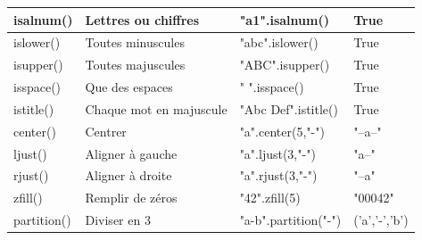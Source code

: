 \documentclass[12pt,a4paper]{article}
\begin{document}
\begin{longtable}{|>{\ttfamily}m{2.5cm}|m{3cm}|>{\ttfamily}m{4cm}|m{2.5cm}|}
		isalnum() & Lettres ou chiffres & "a1".isalnum() & True \\
		\hline
		islower() & Toutes minuscules & "abc".islower() & True \\
		\hline
		\rowcolor{grisclair}
		isupper() & Toutes majuscules & "ABC".isupper() & True \\
		\hline
		isspace() & Que des espaces & " ".isspace() & True \\
		\hline
		\rowcolor{grisclair}
		istitle() & Chaque mot en majuscule & "Abc Def".istitle() & True \\
		\hline
		center() & Centrer & "a".center(5,"-") & "--a--" \\
		\hline
		\rowcolor{grisclair}
		ljust() & Aligner à gauche & "a".ljust(3,"-") & "a--" \\
		\hline
		rjust() & Aligner à droite & "a".rjust(3,"-") & "--a" \\
		\hline
		\rowcolor{grisclair}
		zfill() & Remplir de zéros & "42".zfill(5) & "00042" \\
		\hline
		partition() & Diviser en 3 & "a-b".partition("-") & ('a','-','b') \\
		\hline
	\end{longtable}
	
	\vspace{1cm}
	\begin{center}
	\end{center}
	
\end{document}
